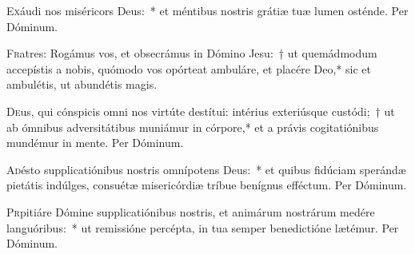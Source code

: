 \documentclass[vesperale_romanum.tex]{subfiles}
\begin{document}
\oratio

\lettrine{E}{x}áudi nos miséricors Deus:~* et méntibus nostris grátiæ tuæ lumen osténde. Per Dóminum.



\lettrine{F}{r}atres: Rogámus vos, et obsecrámus in Dómino Jesu:~† ut quemádmodum accepístis a nobis, quómodo vos opórteat ambuláre, et placére Deo,* sic et ambulétis, ut abundétis magis.



\oratio

\lettrine{D}{e}us, qui cónspicis omni nos virtúte destítui: intérius exteriúsque custódi;~† ut ab ómnibus adversitátibus muniámur in córpore,* et a právis cogitatiónibus mundémur in mente. Per Dóminum.






\oratio

\lettrine{A}{d}ésto supplicatiónibus nostris omnípotens Deus:~* et quibus fidúciam sperándæ pietátis indúlges, consuétæ misericórdiæ tríbue benígnus efféctum. Per Dóminum.



\oratio

\lettrine{P}{r}pitiáre Dómine supplicatiónibus nostris, et animárum nostrárum medére languóribus:~* ut remissióne percépta, in tua semper benedictióne lætémur. Per Dóminum.


\end{document}
